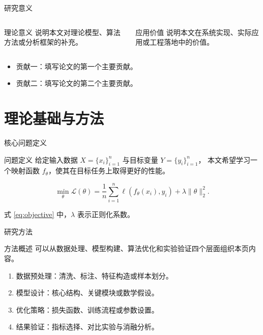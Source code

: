 \documentclass[12pt,aspectratio=43]{beamer}
\begin{document}
\begin{frame}{研究意义}
  \begin{columns}
    \begin{block}{理论意义}
      说明本文对理论模型、算法方法或分析框架的补充。
    \end{block}

    \begin{block}{应用价值}
      说明本文在系统实现、实际应用或工程落地中的价值。
    \end{block}
  \end{columns}

  \vspace{.35cm}
  \begin{itemize}
    \item 贡献一：填写论文的第一个主要贡献。
    \item 贡献二：填写论文的第二个主要贡献。
  \end{itemize}
\end{frame}

\section{理论基础与方法}

\begin{frame}{核心问题定义}
  \vspace{.6cm}
  \begin{block}{问题定义}
    给定输入数据 $X=\{x_i\}_{i=1}^{n}$ 与目标变量 $Y=\{y_i\}_{i=1}^{n}$，
    本文希望学习一个映射函数 $f_{\theta}$，使其在目标任务上取得更好的性能。
  \end{block}

  \begin{equation}
    \label{eq:objective}
    \min_{\theta}\mathcal{L}(\theta)
    =
    \frac{1}{n}\sum_{i=1}^{n}
    \ell\left(f_{\theta}(x_i), y_i\right)
    + \lambda \lVert \theta \rVert_2^2 .
  \end{equation}

  式 \eqref{eq:objective} 中，$\lambda$ 表示正则化系数。
\end{frame}

\begin{frame}{研究方法}
  \vspace{.4cm}
  \begin{block}{方法概述}
    可以从数据处理、模型构建、算法优化和实验验证四个层面组织本页内容。
  \end{block}

  \begin{enumerate}
    \item 数据预处理：清洗、标注、特征构造或样本划分。
    \item 模型设计：核心结构、关键模块或数学假设。
    \item 优化策略：损失函数、训练流程或参数设置。
    \item 结果验证：指标选择、对比实验与消融分析。
  \end{enumerate}
\end{frame}
\end{document}
